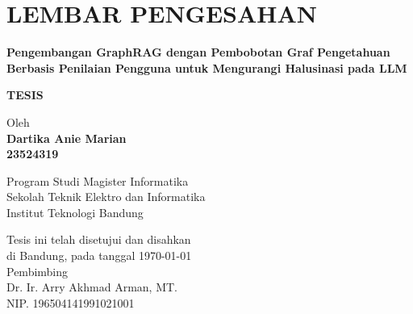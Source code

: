 \chapter*{LEMBAR PENGESAHAN}

\begin{center}
  \vspace{2cm}
  {\large\bfseries Pengembangan GraphRAG dengan Pembobotan Graf Pengetahuan Berbasis Penilaian Pengguna untuk Mengurangi Halusinasi pada LLM}\\
  \vspace{2cm}

  {\Large \textbf{TESIS}}\\

  \vspace{1.5cm}

  {\large Oleh}\\[0.3cm]
  \textbf{
    {\large Dartika Anie Marian}\\
    {\large 23524319}
  }\\

  \vspace{0.5cm}

  {\large Program Studi Magister Informatika}\\
  {\large Sekolah Teknik Elektro dan Informatika}\\
  {\large Institut Teknologi Bandung}\\

  \vspace{1.5cm}

  Tesis ini telah disetujui dan disahkan\\
  di Bandung, pada tanggal \today\\[1cm]

  Pembimbing \\[3cm]
  Dr. Ir. Arry Akhmad Arman, MT. \\[0.2cm]
  NIP. 196504141991021001
\end{center}

\vspace{1cm}
\noindent

